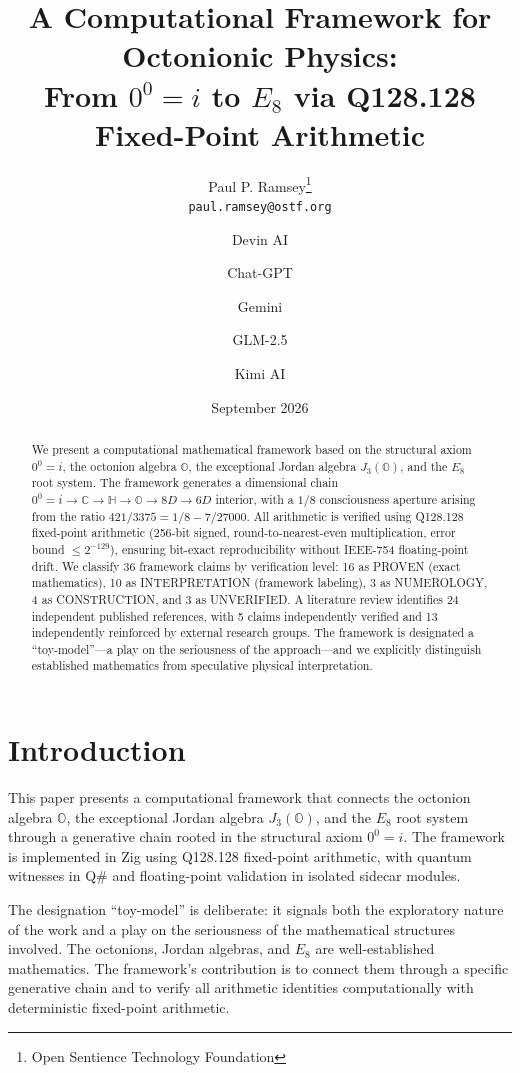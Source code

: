 \documentclass[11pt]{article}
\title{A Computational Framework for Octonionic Physics: \\
From $0^0 = i$ to $E_8$ via Q128.128 Fixed-Point Arithmetic}
\author{
Paul P. Ramsey\thanks{Open Sentience Technology Foundation} \\
\texttt{paul.ramsey@ostf.org}
\and
Devin AI \and Chat-GPT \and Gemini \and GLM-2.5 \and Kimi AI
}
\date{September 2026}
\begin{document}
\maketitle

\begin{abstract}
We present a computational mathematical framework based on the structural axiom $0^0 = i$, the octonion algebra $\mathbb{O}$, the exceptional Jordan algebra $J_3(\mathbb{O})$, and the $E_8$ root system. The framework generates a dimensional chain $0^0 = i \to \mathbb{C} \to \mathbb{H} \to \mathbb{O} \to 8D \to 6D$ interior, with a $1/8$ consciousness aperture arising from the ratio $421/3375 = 1/8 - 7/27000$. All arithmetic is verified using Q128.128 fixed-point arithmetic (256-bit signed, round-to-nearest-even multiplication, error bound $\leq 2^{-129}$), ensuring bit-exact reproducibility without IEEE-754 floating-point drift. We classify 36 framework claims by verification level: 16 as PROVEN (exact mathematics), 10 as INTERPRETATION (framework labeling), 3 as NUMEROLOGY, 4 as CONSTRUCTION, and 3 as UNVERIFIED. A literature review identifies 24 independent published references, with 5 claims independently verified and 13 independently reinforced by external research groups. The framework is designated a ``toy-model''---a play on the seriousness of the approach---and we explicitly distinguish established mathematics from speculative physical interpretation.
\end{abstract}

\tableofcontents
\newpage

\section{Introduction}

This paper presents a computational framework that connects the octonion algebra $\mathbb{O}$, the exceptional Jordan algebra $J_3(\mathbb{O})$, and the $E_8$ root system through a generative chain rooted in the structural axiom $0^0 = i$. The framework is implemented in Zig using Q128.128 fixed-point arithmetic, with quantum witnesses in Q\# and floating-point validation in isolated sidecar modules.

The designation ``toy-model'' is deliberate: it signals both the exploratory nature of the work and a play on the seriousness of the mathematical structures involved. The octonions, Jordan algebras, and $E_8$ are well-established mathematics. The framework's contribution is to connect them through a specific generative chain and to verify all arithmetic identities computationally with deterministic fixed-point arithmetic.
\end{document}
